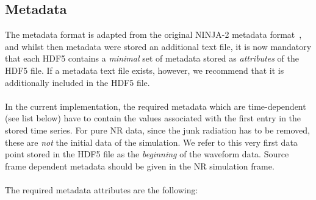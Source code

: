 \documentclass[aps,prd,amssymb,amsmath,amsfonts,superscriptaddress,
floatfix ,preprintnumbers,altaffilletter]{revtex4}
\begin{document}
\subsection{Metadata}
\label{sec:meta}
The metadata format is adapted from the original NINJA-2 metadata format~\cite{Brown:2007jx}, and whilst then metadata were stored an additional text file, it is now mandatory that each HDF5 contains a \emph{minimal} set of metadata stored as \emph{attributes} of the HDF5 file. 
If a metadata text file exists, however, we recommend that it is additionally included in the HDF5 file.\\
\\In the current implementation, the required metadata which are time-dependent (see list below) have to contain the values associated with the first entry in the stored time series. For pure NR data, since the junk radiation has to be removed, these are \emph{not} the initial data of the simulation. We refer to this very first data point stored in the HDF5 file as the \emph{beginning} of the waveform data. Source frame dependent metadata should be given in the NR simulation frame. \\
\\The required metadata attributes are the following:
\end{document}

